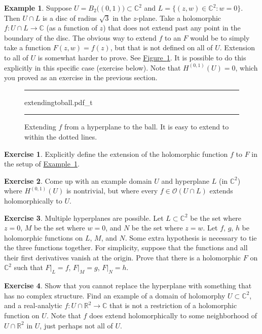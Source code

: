 \documentclass[12pt,openany]{book}
\newcommand{\C}{{\mathbb{C}}}
\newcommand{\R}{{\mathbb{R}}}
\newcommand{\sO}{{\mathscr{O}}}
\theoremstyle{plain}
\theoremstyle{remark}
\theoremstyle{definition}
\newenvironment{exbox}{%
    \def\FrameCommand{\vrule width 1pt \relax\hspace{10pt}}%
    \MakeFramed{\advance\hsize-\width\FrameRestore}%
}{%
    \endMakeFramed
}
\newenvironment{myfig}{%
\begin{figure}[h!t]
\noindent\rule{\textwidth}{0.5pt}\vspace{12pt}\par\centering}%
{\par\noindent\rule{\textwidth}{0.5pt}
\end{figure}}
\theoremstyle{exercise}
\newtheorem{exercise}{Exercise}[section]
\theoremstyle{example}
\newtheorem{example}[thm]{Example}
\newcommand{\figureref}[1]{\hyperref[#1]{Figure~\ref*{#1}}}
\newcommand{\exampleref}[1]{\hyperref[#1]{Example~\ref*{#1}}}
\begin{document}
\begin{example} \label{example:ballextend}
Suppose $U = B_2\bigl((0,1)\bigr) \subset \C^2$ and
$L = \{ (z,w) \in \C^2 : w = 0 \}$.
Then $U \cap L$ is a disc of radius $\sqrt{3}$ in the $z$-plane.
Take a holomorphic $f \colon U \cap L \to \C$ (as a function of $z$) that
does not extend past any point in the boundary of the disc.
The obvious way to extend $f$ to an
$F$ would be to simply take a function $F(z,w) = f(z)$, but that is not
defined on all of $U$.
Extension to all of $U$ is somewhat harder to prove.  See
\figureref{fig:extendingtoball}.  It is possible to do this explicitly in
this specific case (exercise below).  Note that
$H^{(0,1)}(U) = 0$, which you proved
as an exercise in the previous section.
\begin{myfig}
{extendingtoball.pdf_t}
\caption{Extending $f$ from a hyperplane to the
ball.  It is easy to extend to within the dotted lines.\label{fig:extendingtoball}}
\end{myfig}
\end{example}

\begin{exbox}
\begin{exercise}
Explicitly define the extension of the holomorphic function $f$ to $F$
in the setup of \exampleref{example:ballextend}.
\end{exercise}

\begin{exercise}
Come up with an example domain $U$ and hyperplane $L$ (in $\C^2$)
where $H^{(0,1)}(U)$ is nontrivial, but where
every $f \in \sO(U \cap L)$ extends holomorphically to $U$.
\end{exercise}

\begin{exercise}
Multiple hyperplanes are possible.  Let $L \subset \C^2$ be the set
where $z=0$, $M$ be the set where $w=0$, and $N$ be the set where
$z=w$.  Let $f$, $g$, $h$ be holomorphic functions on $L$, $M$, and $N$.
Some extra hypothesis is necessary to tie the
three functions together.  For simplicity,
suppose that the functions and all their first derivatives vanish at
the origin.
Prove that there is a holomorphic
$F$ on $\C^2$ such that
$F|_L = f$,
$F|_M = g$,
$F|_N = h$.
\end{exercise}

\begin{exercise}
Show that you cannot replace the hyperplane with something that has no
complex structure.  Find an example of a domain of holomorphy $U \subset
\C^2$, and a real-analytic $f \colon U \cap \R^2 \to \C$
that is not a restriction of a holomorphic function on $U$.
Note that $f$ does extend holomorphically to some
neighborhood of $U \cap \R^2$ in $U$, just perhaps not all of $U$.
\end{exercise}
\end{exbox}
\end{document}
